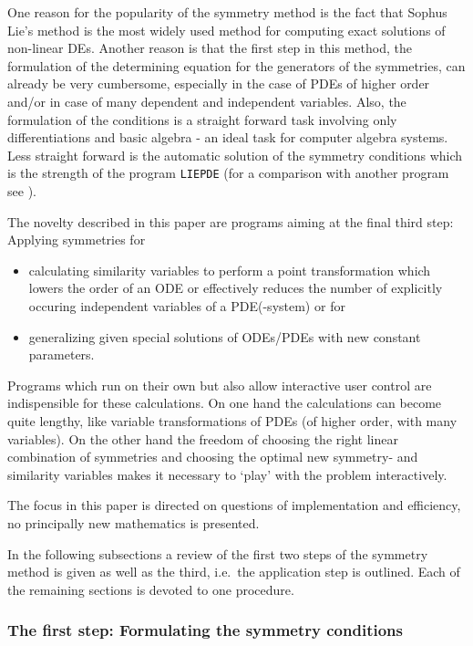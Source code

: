 One reason for the popularity of the symmetry method
is the fact that Sophus Lie's method
\cite{Lie:1880,Lie:1967} is the most widely
used method for computing exact solutions of non-linear DEs. Another reason is
that the first step in this
method, the formulation of the determining equation for the generators
of the symmetries, can already be very cumbersome, especially in the
case of PDEs of higher order and/or in case of many dependent and independent
variables. Also, the formulation of the conditions is a straight forward
task involving only differentiations and basic algebra - an ideal task for
computer algebra systems. Less straight forward is the automatic solution
of the symmetry conditions which is the strength of the program \texttt{LIEPDE}
(for a comparison with another program see \cite{Wolf:93}).

The novelty described in this paper are programs aiming at
the final third step: Applying symmetries for
\begin{itemize}
\item calculating similarity variables to perform a point transformation
which lowers the order of an ODE or effectively reduces the number of
explicitly occuring independent variables of a PDE(-system) or for
\item generalizing given special solutions of ODEs/PDEs with new constant
parameters.
\end{itemize}
Programs which run on their own but also allow interactive user control
are indispensible for these calculations. On one hand the calculations can
become quite lengthy, like variable transformations of PDEs (of higher order,
with many variables). On the other hand the freedom of choosing the right
linear combination of symmetries and choosing the optimal new symmetry- and
similarity variables makes it necessary to `play' with the problem
interactively.

The focus in this paper is directed on questions of implementation and
efficiency, no principally new mathematics is presented.

In the following subsections a review of the first two steps of the symmetry
method is given as well as the third, i.e.\ the application step is outlined.
Each of the remaining sections is devoted to one procedure.
\subsubsection{The first step: Formulating the symmetry conditions}

